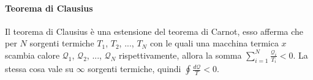     \paragraph{Teorema di Clausius}
        Il teorema di Clausius è una estensione del teorema di Carnot, esso afferma che per $N$ sorgenti termiche $T_1$, $T_2$, ..., $T_N$ con le quali una macchina termica $x$ scambia calore $\mathcal{Q}_1$, $\mathcal{Q}_2$, ..., $\mathcal{Q}_N$ rispettivamente, allora la somma $\displaystyle\sum_{i=1}^N \frac{\mathcal{Q}_i}{T_i} < 0$. La stessa cosa vale su $\infty$ sorgenti termiche, quindi $\displaystyle\oint\frac{d\mathcal{Q}}{T} < 0$.
    